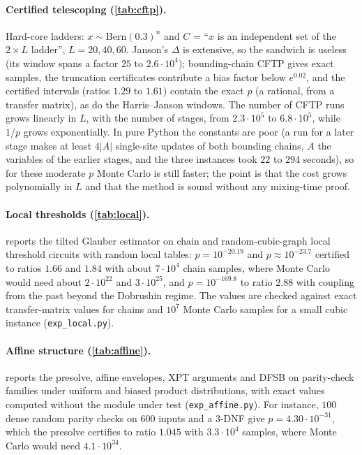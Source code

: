 \paragraph{Certified telescoping (\cref{tab:cftp}).} Hard-core ladders: $x\sim
\mathrm{Bern}(0.3)^{n}$ and $C$ = ``$x$ is an independent set of the $2\times L$
ladder'', $L=20,40,60$. Janson's $\Delta$ is extensive, so the sandwich is useless (its
window spans a factor $25$ to $2.6\cdot10^4$); bounding-chain CFTP gives exact samples,
the truncation certificates contribute a bias factor below $e^{0.02}$, and the
certified intervals (ratios $1.29$ to $1.61$) contain the exact $p$ (a rational, from a
transfer matrix), as do the Harris--Janson windows. The number of CFTP runs grows linearly
in $L$, with the number of stages, from $2.3\cdot10^5$ to $6.8\cdot10^5$, while $1/p$ grows
exponentially. In pure Python the constants are poor (a run for a later stage makes at
least $4|A|$ single-site updates of both bounding chains, $A$ the variables of the
earlier stages, and the three instances took $22$ to $294$ seconds), so for these
moderate $p$ Monte Carlo is still faster; the point is that the cost grows polynomially
in $L$ and that the method is sound without any mixing-time proof.

\begin{table}[ht]
\centering\scriptsize
{}
\caption{Certified telescoping on hard-core ladders (\texttt{exp\_cftp.py}).}
\label{tab:cftp}
\end{table}

\paragraph{Local thresholds (\cref{tab:local}).}  reports the tilted
Glauber estimator on chain and random-cubic-graph local threshold circuits with random
local tables: $p=10^{-20.19}$ and $p\approx10^{-23.7}$ certified to ratios $1.66$ and
$1.84$ with about $7\cdot10^4$ chain samples, where Monte Carlo would need about
$2\cdot10^{22}$ and $3\cdot10^{25}$, and $p=10^{-169.8}$ to ratio $2.88$ with coupling from
the past beyond the Dobrushin regime. The values are checked against exact
transfer-matrix values for chains and $10^7$ Monte Carlo samples for a small cubic
instance (\texttt{exp\_local.py}).

\paragraph{Affine structure (\cref{tab:affine}).}  reports the
presolve, affine envelopes, XPT arguments and DFSB on parity-check families under
uniform and biased product distributions, with exact values computed without the
module under test (\texttt{exp\_affine.py}). For instance, $100$ dense random parity
checks on $600$ inputs and a 3-DNF give $p=4.30\cdot10^{-31}$, which the presolve
certifies to ratio $1.045$ with $3.3\cdot10^4$ samples, where Monte Carlo would need
$4.1\cdot10^{34}$.

